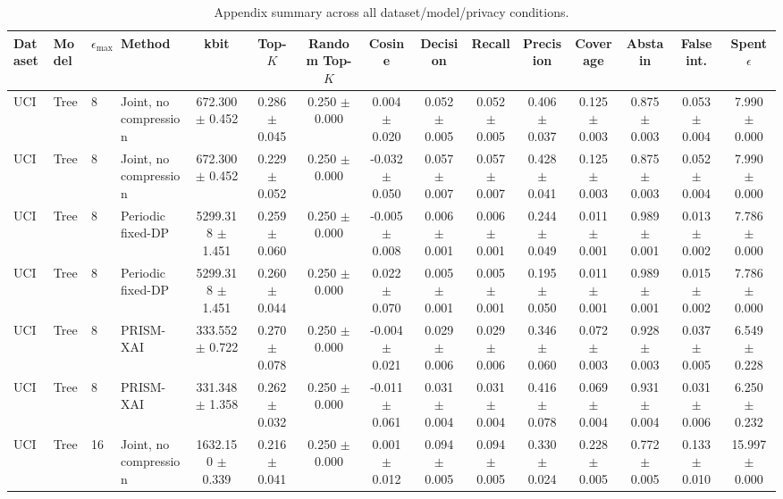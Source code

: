 \begin{table}[t]
\caption{Appendix summary across all dataset/model/privacy conditions.}
\label{tab:appendix-conditions}
\centering
\scriptsize
\setlength{\tabcolsep}{2.5pt}
\begin{tabular}{llllccccccccccc}
\toprule
Dataset & Model & $\epsilon_{\max}$ & Method & kbit & Top-$K$ & Random Top-$K$ & Cosine & Decision & Recall & Precision & Coverage & Abstain & False int. & Spent $\epsilon$ \\
\midrule
UCI & Tree & 8 & Joint, no compression & 672.300 $\pm$ 0.452 & 0.286 $\pm$ 0.045 & 0.250 $\pm$ 0.000 & 0.004 $\pm$ 0.020 & 0.052 $\pm$ 0.005 & 0.052 $\pm$ 0.005 & 0.406 $\pm$ 0.037 & 0.125 $\pm$ 0.003 & 0.875 $\pm$ 0.003 & 0.053 $\pm$ 0.004 & 7.990 $\pm$ 0.000 \\
UCI & Tree & 8 & Joint, no compression & 672.300 $\pm$ 0.452 & 0.229 $\pm$ 0.052 & 0.250 $\pm$ 0.000 & -0.032 $\pm$ 0.050 & 0.057 $\pm$ 0.007 & 0.057 $\pm$ 0.007 & 0.428 $\pm$ 0.041 & 0.125 $\pm$ 0.003 & 0.875 $\pm$ 0.003 & 0.052 $\pm$ 0.004 & 7.990 $\pm$ 0.000 \\
UCI & Tree & 8 & Periodic fixed-DP & 5299.318 $\pm$ 1.451 & 0.259 $\pm$ 0.060 & 0.250 $\pm$ 0.000 & -0.005 $\pm$ 0.008 & 0.006 $\pm$ 0.001 & 0.006 $\pm$ 0.001 & 0.244 $\pm$ 0.049 & 0.011 $\pm$ 0.001 & 0.989 $\pm$ 0.001 & 0.013 $\pm$ 0.002 & 7.786 $\pm$ 0.000 \\
UCI & Tree & 8 & Periodic fixed-DP & 5299.318 $\pm$ 1.451 & 0.260 $\pm$ 0.044 & 0.250 $\pm$ 0.000 & 0.022 $\pm$ 0.070 & 0.005 $\pm$ 0.001 & 0.005 $\pm$ 0.001 & 0.195 $\pm$ 0.050 & 0.011 $\pm$ 0.001 & 0.989 $\pm$ 0.001 & 0.015 $\pm$ 0.002 & 7.786 $\pm$ 0.000 \\
UCI & Tree & 8 & PRISM-XAI & 333.552 $\pm$ 0.722 & 0.270 $\pm$ 0.078 & 0.250 $\pm$ 0.000 & -0.004 $\pm$ 0.021 & 0.029 $\pm$ 0.006 & 0.029 $\pm$ 0.006 & 0.346 $\pm$ 0.060 & 0.072 $\pm$ 0.003 & 0.928 $\pm$ 0.003 & 0.037 $\pm$ 0.005 & 6.549 $\pm$ 0.228 \\
UCI & Tree & 8 & PRISM-XAI & 331.348 $\pm$ 1.358 & 0.262 $\pm$ 0.032 & 0.250 $\pm$ 0.000 & -0.011 $\pm$ 0.061 & 0.031 $\pm$ 0.004 & 0.031 $\pm$ 0.004 & 0.416 $\pm$ 0.078 & 0.069 $\pm$ 0.004 & 0.931 $\pm$ 0.004 & 0.031 $\pm$ 0.006 & 6.250 $\pm$ 0.232 \\
UCI & Tree & 16 & Joint, no compression & 1632.150 $\pm$ 0.339 & 0.216 $\pm$ 0.041 & 0.250 $\pm$ 0.000 & 0.001 $\pm$ 0.012 & 0.094 $\pm$ 0.005 & 0.094 $\pm$ 0.005 & 0.330 $\pm$ 0.024 & 0.228 $\pm$ 0.005 & 0.772 $\pm$ 0.005 & 0.133 $\pm$ 0.010 & 15.997 $\pm$ 0.000 \\

\end{tabular}
\end{table}
